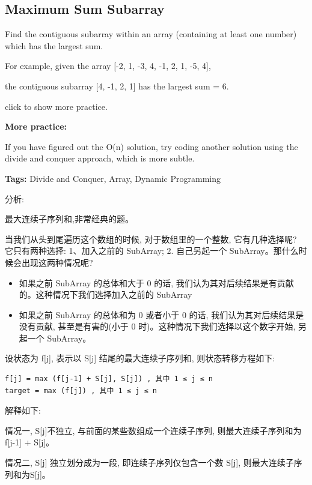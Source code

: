 \documentclass[12pt]{book}
\begin{document}
\subsection{Maximum Sum Subarray}
\label{sec-14-2-6}
Find the contiguous subarray within an array (containing at least one number) which has the largest sum.

For example, given the array [-2, 1, -3, 4, -1, 2, 1, -5, 4], 

the contiguous subarray [4, -1, 2, 1] has the largest sum = 6.

click to show more practice.

\textbf{More practice:}

If you have figured out the O(n) solution, try coding another solution using the divide and conquer approach, which is more subtle.

\textbf{Tags:} Divide and Conquer, Array, Dynamic Programming

分析:

最大连续子序列和,非常经典的题。

当我们从头到尾遍历这个数组的时候, 对于数组里的一个整数, 它有几种选择呢? 它只有两种选择: 1、加入之前的 SubArray;  2. 自己另起一个 SubArray。那什么时候会出现这两种情况呢?

\begin{itemize}
\item 如果之前 SubArray 的总体和大于 0 的话, 我们认为其对后续结果是有贡献的。这种情况下我们选择加入之前的 SubArray

\item 如果之前 SubArray 的总体和为 0 或者小于 0 的话, 我们认为其对后续结果是没有贡献, 甚至是有害的(小于 0 时)。这种情况下我们选择以这个数字开始, 另起一个 SubArray。
\end{itemize}

设状态为 f[j], 表示以 S[j] 结尾的最大连续子序列和, 则状态转移方程如下:
\lstset{language=java,label= ,caption= ,numbers=none}
\begin{lstlisting}
f[j] = max (f[j-1] + S[j], S[j]) , 其中 1 ≤ j ≤ n
target = max (f[j]) , 其中 1 ≤ j ≤ n
\end{lstlisting}

解释如下:

情况一, S[j]不独立, 与前面的某些数组成一个连续子序列, 则最大连续子序列和为 f[j-1] + S[j]。

情况二, S[j] 独立划分成为一段, 即连续子序列仅包含一个数 S[j], 则最大连续子序列和为S[j]。
\end{document}
